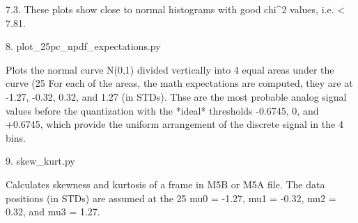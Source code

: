 \documentclass[letterpaper,twoside,12pt]{article}
\begin{document}
7.3. These plots show close to normal histograms with good chi^2 values, i.e.
< 7.81.


8. plot_25pc_npdf_expectations.py

Plots the normal curve N(0,1) divided vertically into 4 equal areas under the 
curve (25%
For each of the areas, the math expectations are computed, they are at 
    -1.27, -0.32, 0.32, and 1.27 (in STDs). 
Thse are the most probable analog signal values before the quantization with
the *ideal* thresholds -0.6745, 0, and +0.6745, which provide the uniform 
arrangement of the discrete signal in the 4 bins.  


9. skew_kurt.py

Calculates skewness and kurtosis of a frame in M5B or M5A file.
The data positions (in STDs) are assumed at the 25%
  mu0 = -1.27, mu1 = -0.32, mu2 = 0.32, and mu3 = 1.27.
\end{document}
